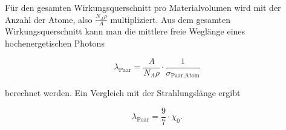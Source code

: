 Für den gesamten Wirkungsquerschnitt pro Materialvolumen wird mit der Anzahl der Atome, also
$\frac{N_A\rho}{A}$ multipliziert. Aus dem gesamten Wirkungsquerschnitt kann man die mittlere freie
Weglänge eines hochenergetischen Photons 

\[\lambda_{\text{Paar}} = \frac{A}{N_A\rho}\cdot \frac{1}{\sigma_{\text{Paar,Atom}}} \]

berechnet werden. Ein Vergleich mit der Strahlungslänge ergibt 

\[\lambda_{\text{Paar}} = \frac{9}{7}\cdot \chi_0. \]
